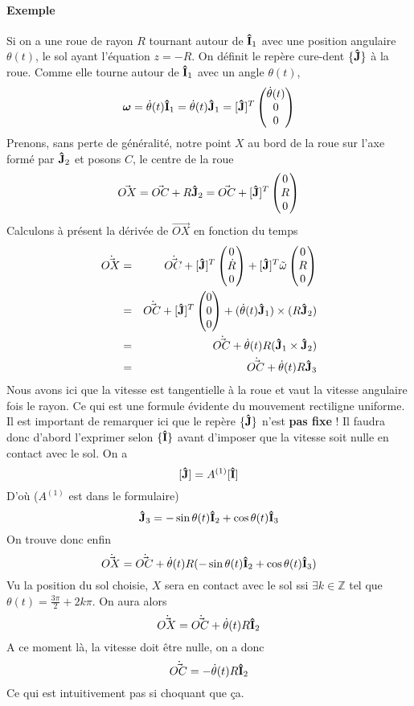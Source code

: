 \paragraph{Exemple}
Si on a une roue de rayon $R$ tournant autour de ${\bf\hat{I}}_1$ avec une position angulaire $\theta(t)$, le sol ayant l'équation $z = -R$.
On définit le repère cure-dent $\{{\bf\hat{J}}\}$ à la roue.
Comme elle tourne autour de ${\bf\hat{I}}_1$ avec un angle $\theta(t)$,
\[ {\bm \omega} = \dot{\theta}(t) {\bf\hat{I}}_1 = \dot{\theta}(t) {\bf\hat{J}}_1 = [{\bf\hat{J}}]^T
  \begin{pmatrix}
    \dot{\theta}(t)\\0\\0
\end{pmatrix} \]
Prenons, sans perte de généralité, notre point $X$ au bord de la roue sur l'axe formé par ${\bf\hat{J}}_2$ et posons $C$, le centre de la roue
\[ \vec{OX} = \vec{OC} + R {\bf\hat{J}}_2 = \vec{OC} + [{\bf\hat{J}}]^T
  \begin{pmatrix}
    0\\R\\0
\end{pmatrix} \]
Calculons à présent la dérivée de $\vec{OX}$ en fonction du temps
\begin{eqnarray*}
\dot{\vec{ OX}} &=& \dot{\vec{ OC}} + [{\bf\hat{J}}]^T \begin{pmatrix}0\\\dot{R}\\0\end{pmatrix} + [{\bf\hat{J}}]^T \tilde{\omega} \begin{pmatrix}0\\R\\0\end{pmatrix}\\
          &=& \dot{\vec{ OC}} + [{\bf\hat{J}}]^T \begin{pmatrix}0\\0\\0\end{pmatrix} + (\dot{\theta}(t) {\bf\hat{J}}_1) \times (R {\bf\hat{J}}_2)\\
          &=& \dot{\vec{ OC}} + \dot{\theta}(t) R ({\bf\hat{J}}_1 \times {\bf\hat{J}}_2)\\
          &=& \dot{\vec{ OC}} + \dot{\theta}(t) R {\bf\hat{J}}_3\\
\end{eqnarray*}
Nous avons ici que la vitesse est tangentielle à la roue et vaut la vitesse angulaire fois le rayon.
Ce qui est une formule évidente du mouvement rectiligne uniforme.
Il est important de remarquer ici que le repère $\{{\bf\hat{J}}\}$ n'est {\bf pas fixe} !
Il faudra donc d'abord l'exprimer selon $\{{\bf\hat{I}}\}$ avant d'imposer que la vitesse soit nulle en contact avec le sol.
On a
\[ [{\bf\hat{J}}] = A^{(1)} [{\bf\hat{I}}] \]
D'où ($A^{(1)}$ est dans le formulaire)
\[ {\bf\hat{J}}_3 = -\sin\theta(t) {\bf\hat{I}}_2 + \cos\theta(t) {\bf\hat{I}}_3 \]
On trouve donc enfin
\[ \dot{\vec{ OX}} = \dot{\vec{ OC}} + \dot{\theta}(t) R (-\sin\theta(t) {\bf\hat{I}}_2 + \cos\theta(t) {\bf\hat{I}}_3) \]
Vu la position du sol choisie, $X$ sera en contact avec le sol ssi $\exists k \in \mathbb{Z}$ tel que $\theta(t) = \frac{3\pi}{2} + 2k\pi$.
On aura alors
\[ \dot{\vec{ OX}} = \dot{\vec{ OC}} + \dot{\theta}(t) R {\bf\hat{I}}_2 \]
A ce moment là, la vitesse doit être nulle, on a donc
\[ \dot{\vec{ OC}} = -\dot{\theta}(t) R {\bf\hat{I}}_2 \]
Ce qui est intuitivement pas si choquant que ça.


